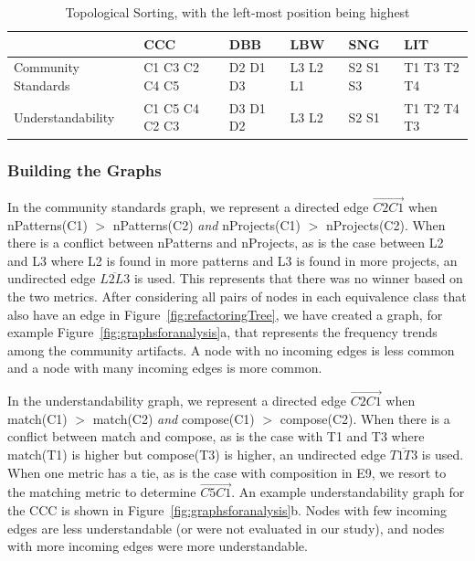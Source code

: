 \begin{table}
\centering
\caption{Topological Sorting, with the left-most position being highest \label{topologicalResults}}
\begin{tabular}{|| l || l || l || l || l || l ||} \hline
				& CCC			& DBB 		& LBW & SNG & LIT \\ \hline
Community Standards		& C1 C3 C2 C4 C5 	& D2 D1 D3	&  L3 L2 L1 	& S2 S1 S3 	& T1 T3 T2 T4 \\
Understandability 			& C1 C5 C4 C2 C3 	& D3 D1 D2 	& L3 L2		& S2 S1		& T1 T2 T4 T3 \\
\hline
\end{tabular}
\end{table}



\subsubsection{Building the Graphs}
In the community standards graph, we represent a directed edge  $\overrightarrow{C2  C1}$ when  nPatterns(C1) $>$ nPatterns(C2) \emph{and}  nProjects(C1) $>$ nProjects(C2).
When there is a conflict between nPatterns and nProjects, as is the case between L2 and L3 where L2 is found in more patterns and L3 is found in more projects, an undirected edge $\overline{L2L3}$ is used.
This represents that there was no winner based on the two metrics. 
After considering all pairs of nodes in each equivalence class that also have an edge in Figure~\ref{fig:refactoringTree}, we have created a graph, for example Figure~\ref{fig:graphsforanalysis}a, that represents the frequency trends among the community artifacts. A node with no incoming edges is less common and a node with many incoming edges is more common. 

In the understandability graph, we represent a directed edge  $\overrightarrow{C2C1}$ when match(C1) $>$ match(C2) \emph{and} compose(C1) $>$ compose(C2). When there is a conflict between match and compose, as is the case with T1 and T3 where match(T1) is higher but compose(T3) is higher, an undirected edge $\overline{T1T3}$ is used. When one metric has a tie, as is the case with composition in E9, we resort to the matching metric to determine  $\overrightarrow{C5C1}$. An example understandability graph for the CCC is shown in Figure~\ref{fig:graphsforanalysis}b. Nodes with few incoming edges are less understandable (or were not evaluated in our study), and nodes with more incoming edges were more understandable. 

